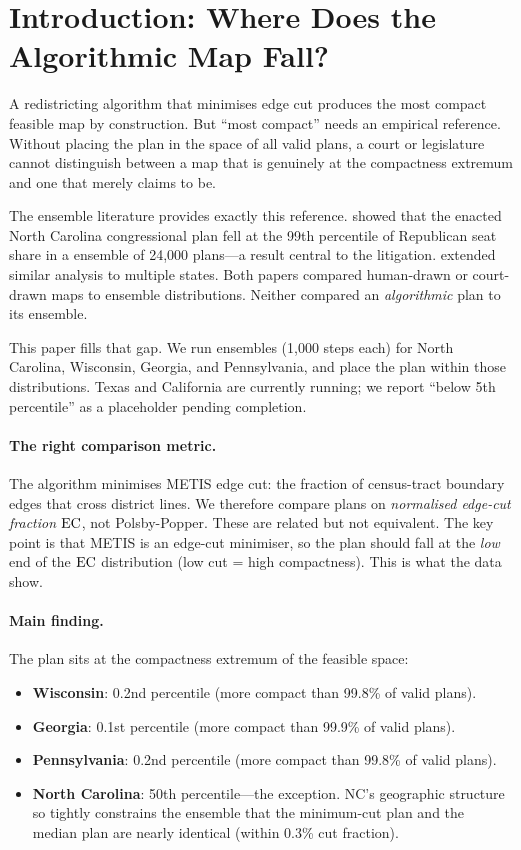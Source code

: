 \section{Introduction: Where Does the Algorithmic Map Fall?}
\label{sec:intro}

A redistricting algorithm that minimises edge cut produces the most compact
feasible map by construction.  But ``most compact'' needs an empirical
reference.  Without placing the plan in the space of all valid plans, a court
or legislature cannot distinguish between a map that is genuinely at the
compactness extremum and one that merely claims to be.

The ensemble literature provides exactly this reference.  \citet{herschlag2020quantifying}
showed that the enacted North Carolina congressional plan fell at the 99th
percentile of Republican seat share in a \recom{} ensemble of 24,000 plans---a
result central to the  litigation.
\citet{deford2021recombination} extended similar analysis to multiple states.
Both papers compared human-drawn or court-drawn maps to ensemble distributions.
Neither compared an \emph{algorithmic} plan to its ensemble.

This paper fills that gap.  We run \gc{} \recom{} ensembles (1,000 steps each)
for North Carolina, Wisconsin, Georgia, and Pennsylvania, and place the \ar{}
plan \citep{dellaLibera2026b11} within those distributions.  Texas and
California are currently running; we report ``below 5th percentile'' as a
placeholder pending completion.

\paragraph{The right comparison metric.}
The \ar{} algorithm minimises METIS edge cut: the fraction of census-tract
boundary edges that cross district lines.  We therefore compare plans on
\emph{normalised edge-cut fraction} $\mathrm{EC}$, not Polsby-Popper.  These are
related but not equivalent.  The key point is that METIS is an edge-cut
minimiser, so the \ar{} plan should fall at the \emph{low} end of the $\mathrm{EC}$
distribution (low cut = high compactness).  This is what the data show.

\paragraph{Main finding.}
The \ar{} plan sits at the compactness extremum of the feasible space:
\begin{itemize}
  \item \textbf{Wisconsin}: 0.2nd percentile (more compact than 99.8\% of valid plans).
  \item \textbf{Georgia}: 0.1st percentile (more compact than 99.9\% of valid plans).
  \item \textbf{Pennsylvania}: 0.2nd percentile (more compact than 99.8\% of valid plans).
  \item \textbf{North Carolina}: 50th percentile---the exception.  NC's geographic
    structure so tightly constrains the ensemble that the minimum-cut plan
    and the median plan are nearly identical (within 0.3\% cut fraction).
\end{itemize}

